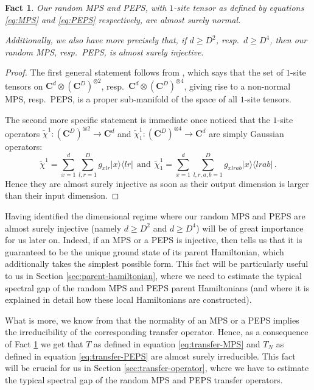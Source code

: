 \documentclass{amsart}
\newtheorem{fact}[theorem]{Fact}
\newcommand{\C}{\mathbf{C}}
\renewcommand{\geq}{\geqslant}
\newcommand{\ketbra}[2]{| #1 \rangle\!\langle #2 |}
\begin{document}
\begin{fact} \label{fact:irreducible}
    Our random MPS and PEPS, with $1$-site tensor as defined by equations \eqref{eq:MPS} and \eqref{eq:PEPS} respectively, are almost surely normal.

    Additionally, we also have more precisely that, if $d\geq D^2$, resp.~$d\geq D^4$, then our random MPS, resp.~PEPS, is almost surely injective.
\end{fact}

\begin{proof}
    The first general statement follows from \cite[Theorem 3.4]{MSV}, which says that the set of $1$-site tensors on $\C^d\otimes(\C^D)^{\otimes 2}$, resp.~$\C^d\otimes(\C^D)^{\otimes 4}$, giving rise to a non-normal MPS, resp.~PEPS, is a proper sub-manifold of the space of all $1$-site tensors.

    The second more specific statement is immediate once noticed that the $1$-site operators $\widetilde{\chi}^1:(\C^D)^{\otimes 2}\longrightarrow\C^d$ and $\widetilde{\chi}_1^1:(\C^D)^{\otimes 4}\longrightarrow\C^d$ are simply Gaussian operators:
    \[ \widetilde{\chi}^1= \sum_{x=1}^d\sum_{l,r=1}^D g_{xlr}\ketbra{x}{lr} \ \ \text{and} \ \ \widetilde{\chi}_1^1= \sum_{x=1}^d\sum_{l,r,a,b=1}^D g_{xlrab}\ketbra{x}{lrab} \, . \]
    Hence they are almost surely injective as soon as their output dimension is larger than their input dimension.
\end{proof}

Having identified the dimensional regime where our random MPS and PEPS are almost surely injective (namely $d\geq D^2$ and $d\geq D^4$) will be of great importance for us later on. Indeed, if an MPS or a PEPS is injective, then \cite[Theorem 3]{CPGVW} tells us that it is guaranteed to be the unique ground state of its parent Hamiltonian, which additionally takes the simplest possible form. This fact will be particularly useful to us in Section \ref{sec:parent-hamiltonian}, where we need to estimate the typical spectral gap of the random MPS and PEPS parent Hamiltonians (and where it is explained in detail how these local Hamiltonians are constructed).

What is more, we know from \cite[Footnote 1]{CPGSW} that the normality of an MPS or a PEPS implies the irreducibility of the corresponding transfer operator. Hence, as a consequence of Fact \ref{fact:irreducible} we get that $T$ as defined in equation \eqref{eq:transfer-MPS} and $T_N$ as defined in equation \eqref{eq:transfer-PEPS} are almost surely irreducible. This fact will be crucial for us in Section \ref{sec:transfer-operator}, where we have to estimate the typical spectral gap of the random MPS and PEPS transfer operators.
\end{document}
